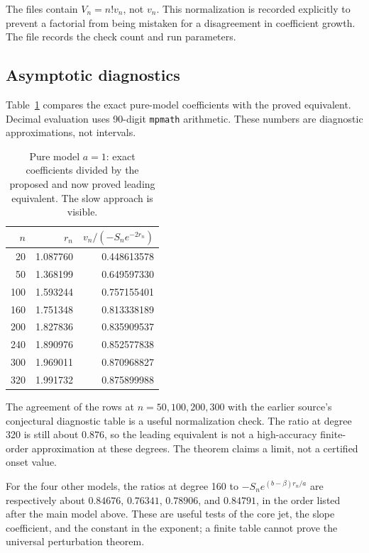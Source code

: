 \documentclass[11pt,a4paper]{article}
\numberwithin{equation}{section}
\theoremstyle{definition}\newtheorem{definition}[theorem]{Definition}
\theoremstyle{remark}\newtheorem{remark}[theorem]{Remark}
\theoremstyle{definition}
\begin{document}
The files  contain \(V_n=n!v_n\), not \(v_n\).
This normalization is recorded explicitly to prevent a factorial from
being mistaken for a disagreement in coefficient growth. The file
 records the check count and run parameters.

\subsection{Asymptotic diagnostics}
Table~\ref{tab:pure} compares the exact pure-model coefficients with the
proved equivalent. Decimal evaluation uses 90-digit \texttt{mpmath}
arithmetic. These numbers are diagnostic approximations, not intervals.

\begin{table}[htbp]
\centering
\caption{Pure model \(a=1\): exact coefficients divided by the proposed
and now proved leading equivalent. The slow approach is visible.}
\label{tab:pure}
\begin{tabular}{rrr}
\toprule
\(n\)&\(r_n\)&\(v_n/(-S_ne^{-2r_n})\)\\
\midrule
20 & 1.087760 & 0.448613578 \\
50 & 1.368199 & 0.649597330 \\
100 & 1.593244 & 0.757155401 \\
160 & 1.751348 & 0.813338189 \\
200 & 1.827836 & 0.835909537 \\
240 & 1.890976 & 0.852577838 \\
300 & 1.969011 & 0.870968827 \\
320 & 1.991732 & 0.875899988 \\
\bottomrule
\end{tabular}
\end{table}

The agreement of the rows at \(n=50,100,200,300\) with the earlier
source's conjectural diagnostic table \cite{finitecore} is a useful
normalization check. The ratio at degree 320 is still about \(0.876\),
so the leading equivalent is not a high-accuracy finite-order approximation
at these degrees. The theorem claims a limit, not a certified onset value.

For the four other models, the ratios at degree 160 to
\(-S_ne^{(b-\beta)r_n/a}\) are respectively about
\(0.84676\), \(0.76341\), \(0.78906\), and \(0.84791\), in the order
listed after the main model above. These are useful tests of the core jet,
the slope coefficient, and the constant in the exponent; a finite table
cannot prove the universal perturbation theorem.
\end{document}
